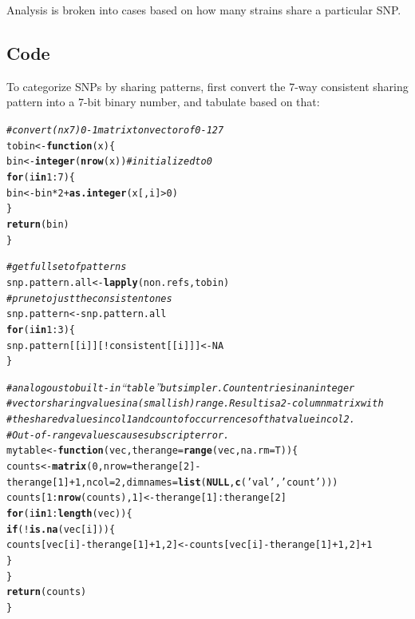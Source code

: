 \documentclass{article}\usepackage[]{graphicx}\usepackage[]{color}
\makeatletter
\newcommand{\hlnum}[1]{\textcolor[rgb]{0.686,0.059,0.569}{#1}}%
\newcommand{\hlstr}[1]{\textcolor[rgb]{0.192,0.494,0.8}{#1}}%
\newcommand{\hlcom}[1]{\textcolor[rgb]{0.678,0.584,0.686}{\textit{#1}}}%
\newcommand{\hlopt}[1]{\textcolor[rgb]{0,0,0}{#1}}%
\newcommand{\hlstd}[1]{\textcolor[rgb]{0.345,0.345,0.345}{#1}}%
\newcommand{\hlkwa}[1]{\textcolor[rgb]{0.161,0.373,0.58}{\textbf{#1}}}%
\newcommand{\hlkwb}[1]{\textcolor[rgb]{0.69,0.353,0.396}{#1}}%
\newcommand{\hlkwc}[1]{\textcolor[rgb]{0.333,0.667,0.333}{#1}}%
\newcommand{\hlkwd}[1]{\textcolor[rgb]{0.737,0.353,0.396}{\textbf{#1}}}%
\newenvironment{kframe}{%
 \def\at@end@of@kframe{}%
 \ifinner\ifhmode%
  \def\at@end@of@kframe{\end{minipage}}%
  \begin{minipage}{\columnwidth}%
 \fi\fi%
 \def\FrameCommand##1{\hskip\@totalleftmargin \hskip-\fboxsep
 \colorbox{shadecolor}{##1}\hskip-\fboxsep
     \hskip-\linewidth \hskip-\@totalleftmargin \hskip\columnwidth}%
 \MakeFramed {\advance\hsize-\width
   \@totalleftmargin\z@ \linewidth\hsize
   \@setminipage}}%
 {\par\unskip\endMakeFramed%
 \at@end@of@kframe}
\newenvironment{knitrout}{}{} %
\makeatother
\begin{document}
Analysis is broken into cases based on how many strains share a particular SNP.

\subsection{Code}
To categorize SNPs by sharing patterns, first convert the 7-way consistent sharing pattern into a 7-bit binary number,
and tabulate based on that:

\begin{knitrout}\footnotesize
{}\color{fgcolor}\begin{kframe}
\begin{alltt}
\hlcom{# convert (n x 7) 0-1 matrix to n vector of 0-127}
\hlstd{tobin} \hlkwb{<-} \hlkwa{function}\hlstd{(}\hlkwc{x}\hlstd{)\{}
  \hlstd{bin} \hlkwb{<-} \hlkwd{integer}\hlstd{(}\hlkwd{nrow}\hlstd{(x))} \hlcom{# initialized to 0}
  \hlkwa{for}\hlstd{(i} \hlkwa{in} \hlnum{1}\hlopt{:}\hlnum{7}\hlstd{)\{}
    \hlstd{bin} \hlkwb{<-} \hlstd{bin}\hlopt{*}\hlnum{2} \hlopt{+} \hlkwd{as.integer}\hlstd{(x[,i]}\hlopt{>}\hlnum{0}\hlstd{)}
  \hlstd{\}}
  \hlkwd{return}\hlstd{(bin)}
\hlstd{\}}

\hlcom{# get full set of patterns}
\hlstd{snp.pattern.all} \hlkwb{<-} \hlkwd{lapply}\hlstd{(non.refs,tobin)}
\hlcom{# prune to just the consistent ones}
\hlstd{snp.pattern} \hlkwb{<-} \hlstd{snp.pattern.all}
\hlkwa{for}\hlstd{(i} \hlkwa{in} \hlnum{1}\hlopt{:}\hlnum{3}\hlstd{)\{}
  \hlstd{snp.pattern[[i]][}\hlopt{!}\hlstd{consistent[[i]]]} \hlkwb{<-} \hlnum{NA}
\hlstd{\}}

\hlcom{# analogous to built-in ``table'' but simpler.  Count entries in an integer}
\hlcom{# vector sharing values in a (smallish) range.  Result is a 2-column matrix with}
\hlcom{# the shared values in col 1 and count of occurrences of that value in col 2.}
\hlcom{# Out-of-range values cause subscript error.}
\hlstd{mytable} \hlkwb{<-} \hlkwa{function}\hlstd{(}\hlkwc{vec}\hlstd{,} \hlkwc{therange}\hlstd{=}\hlkwd{range}\hlstd{(vec,}\hlkwc{na.rm}\hlstd{=T))\{}
  \hlstd{counts} \hlkwb{<-} \hlkwd{matrix}\hlstd{(}\hlnum{0}\hlstd{,}\hlkwc{nrow}\hlstd{=therange[}\hlnum{2}\hlstd{]}\hlopt{-}\hlstd{therange[}\hlnum{1}\hlstd{]}\hlopt{+}\hlnum{1}\hlstd{,}\hlkwc{ncol}\hlstd{=}\hlnum{2}\hlstd{,}\hlkwc{dimnames}\hlstd{=}\hlkwd{list}\hlstd{(}\hlkwa{NULL}\hlstd{,}\hlkwd{c}\hlstd{(}\hlstr{'val'}\hlstd{,}\hlstr{'count'}\hlstd{)))}
  \hlstd{counts[}\hlnum{1}\hlopt{:}\hlkwd{nrow}\hlstd{(counts),}\hlnum{1}\hlstd{]} \hlkwb{<-} \hlstd{therange[}\hlnum{1}\hlstd{]}\hlopt{:}\hlstd{therange[}\hlnum{2}\hlstd{]}
  \hlkwa{for}\hlstd{(i} \hlkwa{in} \hlnum{1}\hlopt{:}\hlkwd{length}\hlstd{(vec))\{}
    \hlkwa{if}\hlstd{(}\hlopt{!}\hlkwd{is.na}\hlstd{(vec[i]))\{}
      \hlstd{counts[vec[i]}\hlopt{-}\hlstd{therange[}\hlnum{1}\hlstd{]}\hlopt{+}\hlnum{1}\hlstd{,}\hlnum{2}\hlstd{]} \hlkwb{<-} \hlstd{counts[vec[i]}\hlopt{-}\hlstd{therange[}\hlnum{1}\hlstd{]}\hlopt{+}\hlnum{1}\hlstd{,}\hlnum{2}\hlstd{]} \hlopt{+} \hlnum{1}
    \hlstd{\}}
  \hlstd{\}}
  \hlkwd{return}\hlstd{(counts)}
\hlstd{\}}


\end{alltt}
\end{kframe}
\end{knitrout}
\end{document}
